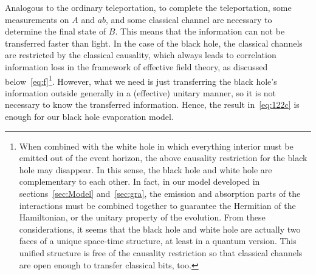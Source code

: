\documentclass[12pt,a4paper]{article}
\begin{document}
Analogous to the ordinary teleportation, to complete the teleportation, some measurements on $A$ and $ab$, and some classical channel are necessary to determine the final state of $B$. This means that the information can not be transferred faster than light. In the case of the black hole, the classical channels are restricted by the classical causality, which always leads to correlation information loss in the framework of effective field theory, as discussed below~\eqref{eq:f}\footnote{When combined with the white hole in which everything interior must be emitted out of the event horizon, the above causality restriction for the black hole may disappear. In this sense, the black hole and white hole are complementary to each other. In fact, in our model developed in sections~\ref{sec:Model} and~\ref{sec:gra}, the emission and absorption parts of the interactions must be combined together to guarantee the Hermitian of the Hamiltonian, or the unitary property of the evolution. From these considerations, it seems that the black hole and white hole are actually two faces of a unique space-time structure, at least in a quantum version. This unified structure is free of the causality restriction so that classical channels are open enough to transfer classical bits, too.}. However, what we need is just transferring the black hole's information outside generally in a (effective) unitary manner, so it is not necessary to know the transferred information. Hence, the result in~\eqref{eq:122c} is enough for our black hole evaporation model.
\end{document}
